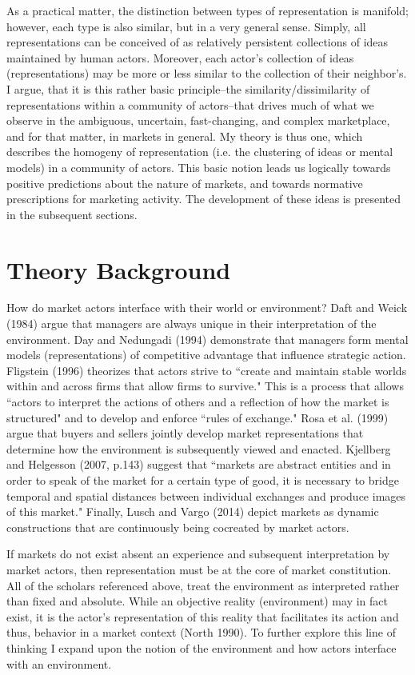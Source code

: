 As a practical matter, the distinction between types of representation is manifold; however, each type is also similar, but in a very general sense. Simply, all representations can be conceived of as relatively persistent collections of ideas maintained by human actors. Moreover, each actor's collection of ideas (representations) may be more or less similar to the collection of their neighbor's. I argue, that it is this rather basic principle--the similarity/dissimilarity of representations within a community of actors--that drives much of what we observe in the ambiguous, uncertain, fast-changing, and complex marketplace, and for that matter, in markets in general. My theory is thus one, which describes the homogeny of representation (i.e. the clustering of ideas or mental models) in a community of actors. This basic notion leads us logically towards positive predictions about the nature of markets, and towards normative prescriptions for marketing activity. The development of these ideas is presented in the subsequent sections.

\section{Theory Background}

How do market actors interface with their world or environment? Daft and Weick (1984) argue that managers are always unique in their interpretation of the environment. Day and Nedungadi (1994) demonstrate that managers form mental models (representations) of competitive advantage that influence strategic action. Fligstein (1996) theorizes that actors strive to ``create and maintain stable worlds within and across firms that allow firms to survive." This is a process that allows ``actors to interpret the actions of others and a reflection of how the market is structured" and to develop and enforce ``rules of exchange."  Rosa et al. (1999) argue that buyers and sellers jointly develop market representations that determine how the environment is subsequently viewed and enacted. Kjellberg and Helgesson (2007, p.143) suggest that ``markets are abstract entities and in order to speak of the market for a certain type of good, it is necessary to bridge temporal and spatial distances between individual exchanges and produce images of this market." Finally, Lusch and Vargo (2014) depict markets as dynamic constructions that are continuously being cocreated by market actors. 

If markets do not exist absent an experience and subsequent interpretation by market actors, then representation must be at the core of market constitution. All of the scholars referenced above, treat the environment as interpreted rather than fixed and absolute. While an objective reality (environment) may in fact exist, it is the actor's representation of this reality that facilitates its action and thus, behavior in a market context (North 1990). To further explore this line of thinking I expand upon the notion of the environment and how actors interface with an environment. 

